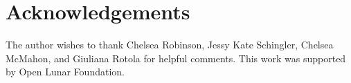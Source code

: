 \documentclass[12pt]{olfmemo}
\begin{document}
\section{Acknowledgements}
The author wishes to thank Chelsea Robinson, Jessy Kate Schingler, Chelsea McMahon, and Giuliana Rotola for helpful comments. This work was supported by Open Lunar Foundation.

%
%   
\end{document}
